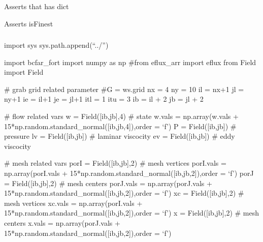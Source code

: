 \documentclass[letterpaper,10pt,english]{sphinxmanual}
\begin{document}
\begin{fulllineitems}
\label{\detokenize{autoapi/tests/test_Workspace/index:tests.test_Workspace.test_has_dict}}
\sphinxAtStartPar
Asserts that has dict

\end{fulllineitems}


\begin{fulllineitems}
\label{\detokenize{autoapi/tests/test_Workspace/index:tests.test_Workspace.test_finest}}
\sphinxAtStartPar
Asserts isFinest

\end{fulllineitems}



\subsubsection{}
\label{\detokenize{autoapi/tests/test_bcfar/index:module-tests.test_bcfar}}\label{\detokenize{autoapi/tests/test_bcfar/index:tests-test-bcfar}}\label{\detokenize{autoapi/tests/test_bcfar/index::doc}}
\sphinxAtStartPar
import sys
sys.path.append(“../”)

\sphinxAtStartPar
import bcfar\_fort
import numpy as np
\#from eflux\_arr import eflux
from Field import Field

\sphinxAtStartPar
\# grab grid related parameter
\#G = ws.grid
nx = 4
ny = 10
il = nx+1
jl = ny+1
ie = il+1
je = jl+1
itl = 1
itu = 3
ib = il + 2
jb = jl + 2

\sphinxAtStartPar
\# flow related vars
w = Field({[}ib,jb{]},4) \# state
w.vals = np.array(w.vals + 15*np.random.standard\_normal({[}ib,jb,4{]}),order = ‘f’)
P = Field({[}ib,jb{]}) \# pressure
lv = Field({[}ib,jb{]}) \# laminar viscocity
ev = Field({[}ib,jb{]}) \# eddy viscocity

\sphinxAtStartPar
\# mesh related vars
porI = Field({[}ib,jb{]},2) \# mesh vertices
porI.vals = np.array(porI.vals + 15*np.random.standard\_normal({[}ib,jb,2{]}),order = ‘f’)
porJ = Field({[}ib,jb{]},2) \# mesh centers
porJ.vals = np.array(porJ.vals + 15*np.random.standard\_normal({[}ib,jb,2{]}),order = ‘f’)
xc = Field({[}ib,jb{]},2) \# mesh vertices
xc.vals = np.array(porI.vals + 15*np.random.standard\_normal({[}ib,jb,2{]}),order = ‘f’)
x = Field({[}ib,jb{]},2) \# mesh centers
x.vals = np.array(porJ.vals + 15*np.random.standard\_normal({[}ib,jb,2{]}),order = ‘f’)
\end{document}
